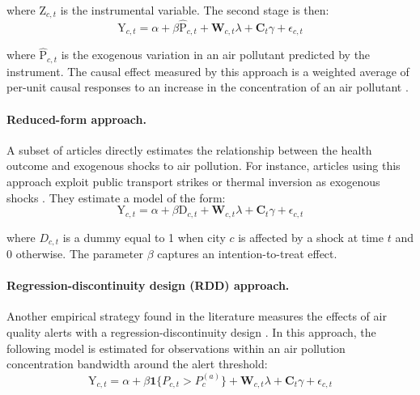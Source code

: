 \documentclass[12pt]{article}
\begin{document}
        \noindent where $\text{Z}_{c,t}$ is the instrumental variable. The second stage is then:
        ~
        \begin{equation}
        \text{Y}_{c,t} = \alpha + \beta\widehat{\text{P}}_{c,t} + \textbf{W}_{c,t}\lambda + \textbf{C}_{t}\gamma + \epsilon_{c,t}
        \end{equation}
        
        \noindent where $\widehat{\text{P}}_{c,t}$ is the exogenous variation in an air pollutant predicted by the instrument. The causal effect measured by this approach is a weighted average of per-unit causal responses to an increase in the concentration of an air pollutant \citep{angrist_two-stage_1995}.

        \paragraph{Reduced-form approach.} A subset of articles directly estimates the relationship between the health outcome and exogenous shocks to air pollution. For instance, articles using this approach exploit public transport strikes or thermal inversion as exogenous shocks \citep{bauernschuster_when_2017, jans_economic_2018, godzinski2019short, giaccherini_when_2021}. They estimate a model of the form:
        ~
        \begin{equation}
        \text{Y}_{c,t} = \alpha + \beta\text{D}_{c,t} + \textbf{W}_{c,t}\lambda + \textbf{C}_{t}\gamma + \epsilon_{c,t}
        \end{equation}
        
        \noindent where $D_{c,t}$ is a dummy equal to 1 when city $c$ is affected by a shock at time $t$ and 0 otherwise. The parameter $\beta$ captures an intention-to-treat effect.

        \begin{sloppypar}
        \paragraph{Regression-discontinuity design (RDD) approach.} Another empirical strategy found in the literature measures the effects of air quality alerts with a regression-discontinuity design \citep{chen_effect_2018, anderson2022bounds}. In this approach, the following model is estimated for observations within an air pollution concentration bandwidth around the alert threshold:
        ~
        \begin{equation}
        \text{Y}_{c,t} = \alpha + \beta \textbf{1}\{P_{c,t} > P^{(a)}_{c}\} + \textbf{W}_{c,t}\lambda + \textbf{C}_{t}\gamma + \epsilon_{c,t}
        \end{equation}
        \end{sloppypar}
        
\end{document}
